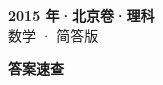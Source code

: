 \documentclass[zihao=-4, a4paper]{ctexart}
\begin{document}
\begin{center}
  {\Large\bfseries 2015 年·北京卷·理科}\\[4pt]
  {\large 数学 · 简答版}
\end{center}
\medskip
{}

\clearpage
{}
\begin{center}{\Large\bfseries 答案速查}\end{center}
\medskip

\end{document}
